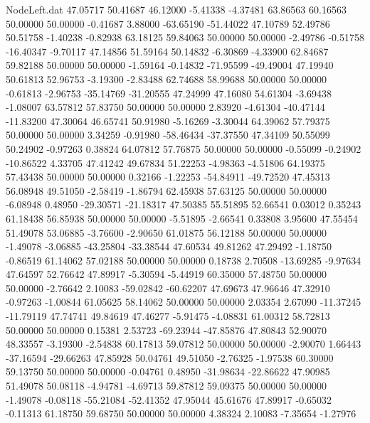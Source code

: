 \begin{filecontents}{NodeLeft.dat}
  47.05717   50.41687   46.12000    -5.41338   -4.37481   63.86563   60.16563   50.00000   50.00000   -0.41687    3.88000  -63.65190  -51.44022
  47.10789   52.49786   50.51758    -1.40238   -0.82938   63.18125   59.84063   50.00000   50.00000   -2.49786   -0.51758  -16.40347   -9.70117
  47.14856   51.59164   50.14832    -6.30869   -4.33900   62.84687   59.82188   50.00000   50.00000   -1.59164   -0.14832  -71.95599  -49.49004
  47.19940   50.61813   52.96753    -3.19300   -2.83488   62.74688   58.99688   50.00000   50.00000   -0.61813   -2.96753  -35.14769  -31.20555
  47.24999   47.16080   54.61304    -3.69438   -1.08007   63.57812   57.83750   50.00000   50.00000    2.83920   -4.61304  -40.47144  -11.83200
  47.30064   46.65741   50.91980    -5.16269   -3.30044   64.39062   57.79375   50.00000   50.00000    3.34259   -0.91980  -58.46434  -37.37550
  47.34109   50.55099   50.24902    -0.97263    0.38824   64.07812   57.76875   50.00000   50.00000   -0.55099   -0.24902  -10.86522    4.33705
  47.41242   49.67834   51.22253    -4.98363   -4.51806   64.19375   57.43438   50.00000   50.00000    0.32166   -1.22253  -54.84911  -49.72520
  47.45313   56.08948   49.51050    -2.58419   -1.86794   62.45938   57.63125   50.00000   50.00000   -6.08948    0.48950  -29.30571  -21.18317
  47.50385   55.51895   52.66541     0.03012    0.35243   61.18438   56.85938   50.00000   50.00000   -5.51895   -2.66541    0.33808    3.95600
  47.55454   51.49078   53.06885    -3.76600   -2.90650   61.01875   56.12188   50.00000   50.00000   -1.49078   -3.06885  -43.25804  -33.38544
  47.60534   49.81262   47.29492    -1.18750   -0.86519   61.14062   57.02188   50.00000   50.00000    0.18738    2.70508  -13.69285   -9.97634
  47.64597   52.76642   47.89917    -5.30594   -5.44919   60.35000   57.48750   50.00000   50.00000   -2.76642    2.10083  -59.02842  -60.62207
  47.69673   47.96646   47.32910    -0.97263   -1.00844   61.05625   58.14062   50.00000   50.00000    2.03354    2.67090  -11.37245  -11.79119
  47.74741   49.84619   47.46277    -5.91475   -4.08831   61.00312   58.72813   50.00000   50.00000    0.15381    2.53723  -69.23944  -47.85876
  47.80843   52.90070   48.33557    -3.19300   -2.54838   60.17813   59.07812   50.00000   50.00000   -2.90070    1.66443  -37.16594  -29.66263
  47.85928   50.04761   49.51050    -2.76325   -1.97538   60.30000   59.13750   50.00000   50.00000   -0.04761    0.48950  -31.98634  -22.86622
  47.90985   51.49078   50.08118    -4.94781   -4.69713   59.87812   59.09375   50.00000   50.00000   -1.49078   -0.08118  -55.21084  -52.41352
  47.95044   45.61676   47.89917    -0.65032   -0.11313   61.18750   59.68750   50.00000   50.00000    4.38324    2.10083   -7.35654   -1.27976

\end{filecontents}
